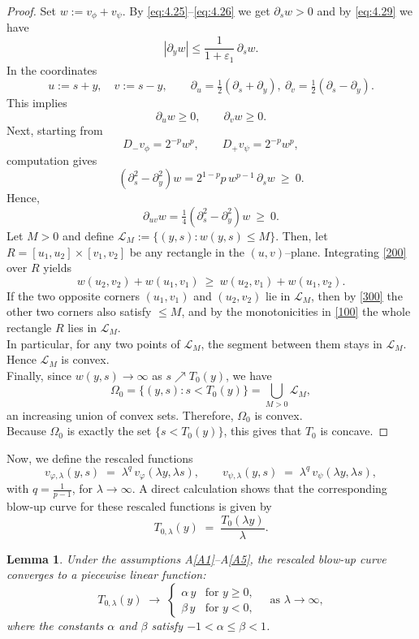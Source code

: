 \documentclass[
  sn-mathphys-num,
  colorlinks,
  linkcolor=darkmagenta,
  citecolor=rufous,
  urlcolor=zaffre,
  hypertexnames=false
]{sn-jnl}
\numberwithin{equation}{section}
\newtheorem{lemma}[theorem]{Lemma}%
\begin{document}
\begin{proof}
Set $w:=v_\phi+v_\psi$. By \eqref{eq:4.25}--\eqref{eq:4.26} we get $\partial_s w>0$ and by \eqref{eq:4.29} we have 
$$
|\partial_y w|\le \frac{1}{1+\varepsilon_1}\,\partial_s w.
$$
In the coordinates
$$
u:=s+y,\quad v:=s-y,\qquad
\partial_u=\tfrac12(\partial_s+\partial_y),\ \partial_v=\tfrac12(\partial_s-\partial_y).
$$
This implies
\begin{equation}\label{100}
\partial_u w\ge0,\qquad \partial_v w\ge0.
\end{equation}
Next, starting from
$$
D_-v_\phi=2^{-p}w^p,\qquad D_+v_\psi=2^{-p}w^p,
$$
 computation gives
$$
(\partial_s^2-\partial_y^2)w
=2^{1-p}p\,w^{p-1}\,\partial_s w\ \ge\ 0.
$$
Hence,
\begin{equation}\label{200}
\partial_{uv}w=\tfrac14(\partial_s^2-\partial_y^2)w\ \ge\ 0.
\end{equation}
Let $M>0$ and define $\mathcal L_M:=\{(y,s): w(y,s)\le M\}$. Then, let $R=[u_1,u_2]\times[v_1,v_2]$ be any rectangle in the $(u,v)–$plane. Integrating \eqref{200} over $R$ yields
\begin{equation}\label{300}
w(u_2,v_2)+w(u_1,v_1)\ \ge\ w(u_2,v_1)+w(u_1,v_2).
\end{equation}
If the two opposite corners $(u_1,v_1)$ and $(u_2,v_2)$ lie in $\mathcal L_M$, then by \eqref{300} the other two corners also satisfy $\le M$, and by the monotonicities in \eqref{100} the whole rectangle $R$ lies in $\mathcal L_M$.\\ In particular, for any two points of $\mathcal L_M$, the segment between them stays in $\mathcal L_M$. Hence $\mathcal L_M$ is convex.\\
Finally, since $w(y,s)\to\infty$ as $s\nearrow T_0(y)$, we have
$$
\Omega_0=\{(y,s): s<T_0(y)\}=\bigcup_{M>0}\mathcal L_M,
$$
an increasing union of convex sets. Therefore, $\Omega_0$ is convex.\\ Because $\Omega_0$ is exactly the set $\{s<T_0(y)\}$, this gives that $T_0$ is concave.
\end{proof}
Now, we define the rescaled functions
$$
v_{\varphi,\lambda}(y,s) \;=\; \lambda^{q}\,v_{\varphi}(\lambda y,\lambda s), 
\qquad
v_{\psi,\lambda}(y,s) \;=\; \lambda^{q}\,v_{\psi}(\lambda y,\lambda s),
$$
with \(q=\frac{1}{p-1}\), for \(\lambda \to \infty\).
A direct calculation shows that the corresponding blow-up curve for these rescaled functions is given by
$$
T_{0,\lambda}(y) \;=\; \frac{T_0(\lambda y)}{\lambda}.
$$

\begin{lemma}\label{lemma:5.3}
Under the assumptions A\ref{A1}--A\ref{A5}, the rescaled blow-up curve converges to a piecewise linear function:
$$
T_{0,\lambda}(y) \;\longrightarrow\; 
\begin{cases}
\alpha\, y & \text{for } y \geq 0, \\[4pt]
\beta\, y  & \text{for } y < 0,
\end{cases}
\quad \text{as } \lambda \to \infty,
$$
where the constants $\alpha$ and $\beta$ satisfy $-1 < \alpha \leq \beta < 1$.
\end{lemma}
\end{document}
